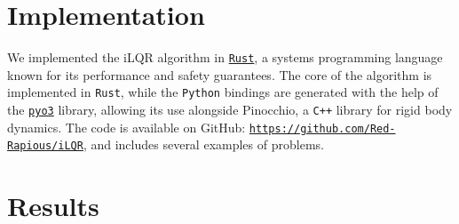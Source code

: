 \documentclass[nodate]{../cs-classes/cs-classes}
\begin{document}
\section{Implementation}
We implemented the iLQR algorithm in \href{https://www.rust-lang.org/}{\texttt{Rust}}, a systems programming language known for its performance and safety guarantees. The core of the algorithm is implemented in \texttt{Rust}, while the \texttt{Python} bindings are generated with the help of the \href{https://pyo3.rs/v0.23.3/}{\texttt{pyo3}} library, allowing its use alongside Pinocchio, a \texttt{C++} library for rigid body dynamics. The code is available on GitHub: \href{https://github.com/Red-Rapious/iLQR}{\texttt{https://github.com/Red-Rapious/iLQR}}, and includes several examples of problems.

\section{Results}
\end{document}
